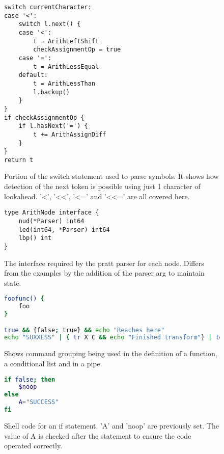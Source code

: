 \begin{figure}[hp]
\begin{lstlisting}[frame=tb,language=Golang]
switch currentCharacter:
case '<':
	switch l.next() {
	case '<':
		t = ArithLeftShift
		checkAssignmentOp = true
	case '=':
		t = ArithLessEqual
	default:
		t = ArithLessThan
		l.backup()
	}
}
if checkAssignmentOp {
	if l.hasNext('=') {
		t += ArithAssignDiff
	}
}
return t
\end{lstlisting}
\caption[Sample of Arithmetic Symbol Lexing]{Portion of the switch statement used to parse symbols. It shows how detection of the next token is possible using just 1 character of lookahead. '<', '<<', '<=' and '<<=' are all covered here.\label{lst:arith-symbol-lex}}
\end{figure}


\begin{figure}[hp]
\begin{lstlisting}[frame=tb,language=Golang]
type ArithNode interface {
	nud(*Parser) int64
	led(int64, *Parser) int64
	lbp() int
}
\end{lstlisting}
\caption[ArithNode interface]{The interface required by the pratt parser for each node\cite{CROCKFORD-TDOP}. Differs from the examples by the addition of the parser arg to maintain state.
\label{lst:arith-node-interface}}
\end{figure}


\begin{figure}[hp]
\begin{lstlisting}[frame=tb,language=bash]
foofunc() {
	foo
}

true && {false; true} && echo "Reaches here"
echo "SUXXESS" | { tr X C && echo "Finished transform"} | tee /dev/null
\end{lstlisting}
\caption[Shell Command Grouping]{Shows command grouping being used in the definition of a function, a conditional list and in a pipe.
\label{lst:command-grouping}}
\end{figure}

\begin{figure}[hp]
\begin{lstlisting}[frame=tb,language=bash]
if false; then
    $noop
else
    A="SUCCESS"
fi
\end{lstlisting}
\caption[Code for a simple if statement]{Shell code for an if statement. 'A' and 'noop' are previously set. The value of A is checked after the statement to ensure the code operated correctly.\label{lst:if-ast-1}}
\end{figure}

